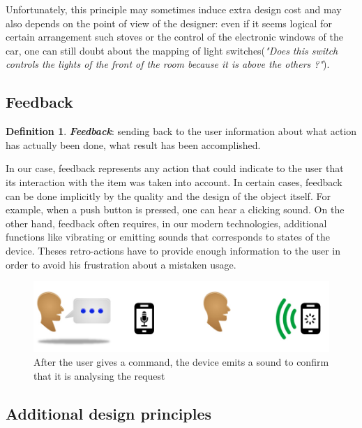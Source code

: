 \documentclass[a4paper,11pt] {article}
\theoremstyle{definition}
\begin{document}
Unfortunately, this principle may sometimes induce extra design cost and may also depends on the point of view of the designer: even if it seems logical for certain arrangement such stoves or the control of the electronic windows of the car, one can still doubt about the mapping of light switches(\textit{"Does this switch controls  the lights of the front of the room because it is above the others ?"}).

    \subsection{Feedback}
\newtheorem{mydef}{Definition}
\begin{mydef}
\textit{\textbf{Feedback}}: sending back to the user information about what action has actually been done, what result has been accomplished.
\cite{Norman02}
\end{mydef}

In our case, feedback represents any action that could indicate to the user that its interaction with the item was taken into account. In certain cases, feedback can be done implicitly by the quality and the design of the object itself. For example, when a push button is  pressed, one can hear a clicking sound. On the other hand, feedback often requires, in our modern technologies, additional functions like vibrating or emitting sounds that corresponds to states of the device. Theses retro-actions have to provide enough information to the user in order to avoid his frustration about a mistaken usage.

\begin{figure}[h]
\centering
\includegraphics[scale=0.5]{fig-report/retro-action-speaking.jpg}
\caption{After the user gives a command, the device emits a sound to confirm that it is analysing the request}
\end{figure}

    \subsection{Additional design principles}
\end{document}

